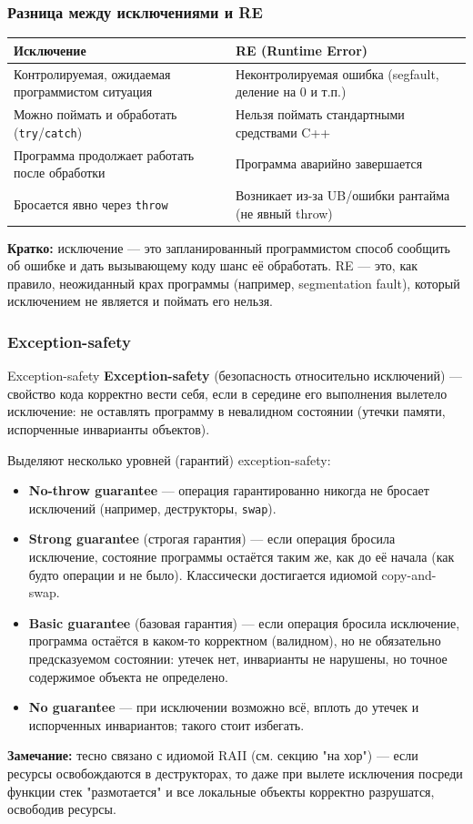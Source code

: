 \subsubsection{Разница между исключениями и RE}
\begin{center}
\begin{tabular}{|l|l|}
\hline
\textbf{Исключение} & \textbf{RE (Runtime Error)} \\
\hline
Контролируемая, ожидаемая программистом ситуация & Неконтролируемая ошибка (segfault, деление на 0 и т.п.) \\
\hline
Можно поймать и обработать (\texttt{try}/\texttt{catch}) & Нельзя поймать стандартными средствами C++ \\
\hline
Программа продолжает работать после обработки & Программа аварийно завершается \\
\hline
Бросается явно через \texttt{throw} & Возникает из-за UB/ошибки рантайма (не явный throw) \\
\hline
\end{tabular}
\end{center}
\textbf{Кратко:} исключение --- это запланированный программистом способ сообщить об ошибке и дать вызывающему коду шанс её обработать. RE --- это, как правило, неожиданный крах программы (например, segmentation fault), который исключением не является и поймать его нельзя.
\subsubsection{Exception-safety}
\begin{definition}{Exception-safety}{}
\textbf{Exception-safety} (безопасность относительно исключений) --- свойство кода корректно вести себя, если в середине его выполнения вылетело исключение: не оставлять программу в невалидном состоянии (утечки памяти, испорченные инварианты объектов).
\end{definition}
Выделяют несколько уровней (гарантий) exception-safety:
\begin{itemize}
  \item \textbf{No-throw guarantee} --- операция гарантированно никогда не бросает исключений (например, деструкторы, \texttt{swap}).
  \item \textbf{Strong guarantee} (строгая гарантия) --- если операция бросила исключение, состояние программы остаётся таким же, как до её начала (как будто операции и не было). Классически достигается идиомой copy-and-swap.
  \item \textbf{Basic guarantee} (базовая гарантия) --- если операция бросила исключение, программа остаётся в каком-то корректном (валидном), но не обязательно предсказуемом состоянии: утечек нет, инварианты не нарушены, но точное содержимое объекта не определено.
  \item \textbf{No guarantee} --- при исключении возможно всё, вплоть до утечек и испорченных инвариантов; такого стоит избегать.
\end{itemize}
\textbf{Замечание:} тесно связано с идиомой RAII (см. секцию "на хор") --- если ресурсы освобождаются в деструкторах, то даже при вылете исключения посреди функции стек "размотается" и все локальные объекты корректно разрушатся, освободив ресурсы.

